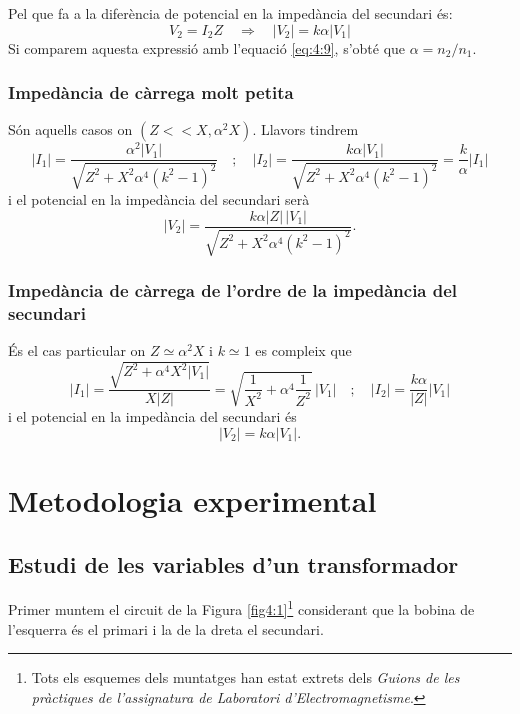 \documentclass[a4paper,10.5pt]{report}
\begin{document}
Pel que fa a la diferència de potencial en la impedància del secundari és:
\begin{equation}
	V_2 = I_2 Z \quad \Longrightarrow \quad |V_2| = k \alpha |V_1|
	\label{eq4:20}
\end{equation}
Si comparem aquesta expressió amb l'equació \eqref{eq:4:9}, s'obté que $\alpha = n_2/n_1$.
\subsubsection{Impedància de càrrega molt petita}
Són aquells casos on $(Z << X,\alpha^2X)$. Llavors tindrem
\begin{equation}
	|I_1| = \frac{\alpha^2 |V_1|}{\sqrt{Z^2 + X^2 \alpha^4 (k^2 - 1)^2}} \quad ; \quad
	|I_2| = \frac{k \alpha |V_1|}{\sqrt{Z^2 + X^2 \alpha^4 (k^2 - 1)^2}} = \frac{k}{\alpha} |I_1|
	\label{eq4:21}
\end{equation}
i el potencial en la impedància del secundari serà
\begin{equation}
	|V_2| = \frac{k \alpha |Z| \, |V_1|}{\sqrt{Z^2 + X^2 \alpha^4 (k^2 - 1)^2}}.
	\label{eq4:22}
\end{equation}
\subsubsection{Impedància de càrrega de l'ordre de la impedància del secundari}
És el cas particular on $Z \simeq \alpha^2X$ i $k \simeq 1$ es compleix que
\begin{equation}
	|I_1| = \frac{\sqrt{Z^2 + \alpha^4 X^2 |V_1|}}{X |Z|} = \sqrt{ \frac{1}{X^2} + \alpha^4 \frac{1}{Z^2} } \, |V_1| 
	\quad ; \quad |I_2| = \frac{k \alpha}{|Z|} |V_1|
	\label{eq4:23}
\end{equation}
i el potencial en la impedància del secundari és
\begin{equation}
	|V_2| = k \alpha |V_1|.
	\label{eq4:24}
\end{equation}

\section{Metodologia experimental}
\subsection{Estudi de les variables d'un transformador}
Primer muntem el circuit de la Figura \ref{fig4:1}\footnote{Tots els esquemes dels muntatges han estat extrets dels \textit{Guions de les pràctiques de l'assignatura de Laboratori d'Electromagnetisme}\cite{ref3}.} considerant que la bobina de l'esquerra és el primari i la de la dreta el secundari.
\end{document}
